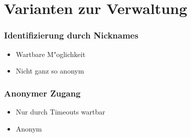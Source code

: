 \section{Varianten zur Verwaltung}

\begin{frame}
	\frametitle{Identifizierung durch Nicknames}
	\begin{itemize}
		\item Wartbare M"oglichkeit
		\item Nicht ganz so anonym
	\end{itemize}
\end{frame}

\begin{frame}
	\frametitle{Anonymer Zugang}
	\begin{itemize}
		\item Nur durch Timeouts wartbar
		\item Anonym
	\end{itemize}
\end{frame}
